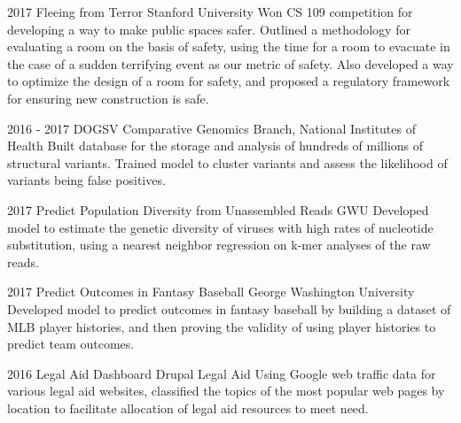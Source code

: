 \documentclass[]{cv}
\begin{document}
\begin{entrylist}
  \entry
    {2017}
    {Fleeing from Terror}
    {Stanford University}
    {Won CS 109 competition for developing a way to make public spaces safer. Outlined a methodology for evaluating a room on the basis of safety, using the time for a room to evacuate in the case of a sudden terrifying event as our metric of safety. Also developed a way to optimize the design of a room for safety, and proposed a regulatory framework for ensuring new construction is safe.}

  \entry
    {2016 - 2017}
    {DOGSV}
    {Comparative Genomics Branch, National Institutes of Health}
    {Built database for the storage and analysis of hundreds of millions of structural variants. Trained model to cluster variants and assess the likelihood of variants being false positives.}
    
  \entry
    {2017}
    {Predict Population Diversity from Unassembled Reads} 
    {GWU}
    {Developed model to estimate the genetic diversity of viruses with high rates of nucleotide substitution, using a nearest neighbor regression on k-mer analyses of the raw reads.}
    
    \entry
    {2017}
    {Predict Outcomes in Fantasy Baseball} 
    {George Washington University}
    {Developed model to predict outcomes in fantasy baseball by building a dataset of MLB player histories, and then proving the validity of using player histories to predict team outcomes.}

  \entry
    {2016}
    {Legal Aid Dashboard} 
    {Drupal Legal Aid}
    {Using Google web traffic data for various legal aid websites, classified the topics of the most popular web pages by location to facilitate allocation of legal aid resources to meet need.}
\end{entrylist}
\end{document}
